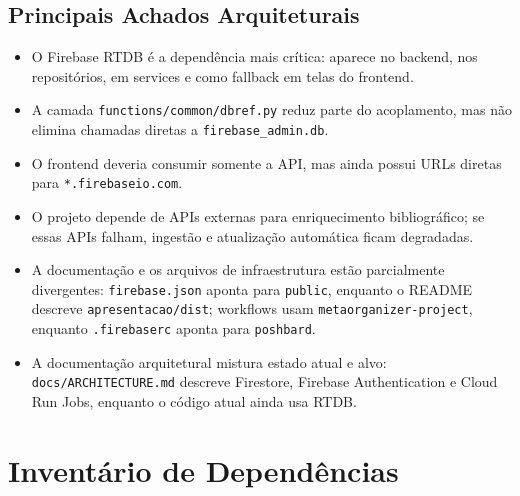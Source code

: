 \documentclass[12pt,a4paper]{article}
\begin{document}
\subsection{Principais Achados Arquiteturais}

\begin{itemize}
  \item O Firebase RTDB {\'e} a depend{\^e}ncia mais cr{\'i}tica: aparece no backend, nos reposit{\'o}rios, em services e como fallback em telas do frontend.
  \item A camada \texttt{functions/common/dbref.py} reduz parte do acoplamento, mas n{\~a}o elimina chamadas diretas a \texttt{firebase\_admin.db}.
  \item O frontend deveria consumir somente a API, mas ainda possui URLs diretas para \texttt{*.firebaseio.com}.
  \item O projeto depende de APIs externas para enriquecimento bibliogr{\'a}fico; se essas APIs falham, ingest{\~a}o e atualiza{\c c}{\~a}o autom{\'a}tica ficam degradadas.
  \item A documenta{\c c}{\~a}o e os arquivos de infraestrutura est{\~a}o parcialmente divergentes: \texttt{firebase.json} aponta para \texttt{public}, enquanto o README descreve \texttt{apresentacao/dist}; workflows usam \texttt{metaorganizer-project}, enquanto \texttt{.firebaserc} aponta para \texttt{poshbard}.
  \item A documenta{\c c}{\~a}o arquitetural mistura estado atual e alvo: \texttt{docs/ARCHITECTURE.md} descreve Firestore, Firebase Authentication e Cloud Run Jobs, enquanto o c{\'o}digo atual ainda usa RTDB.
\end{itemize}

\section{Invent{\'a}rio de Depend{\^e}ncias}
\end{document}
